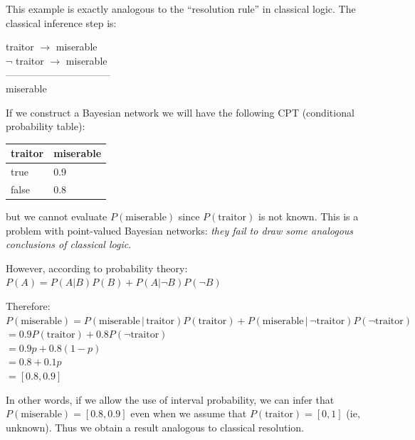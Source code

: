 This example is exactly analogous to the ``resolution rule'' in classical logic.  The classical inference step is:

\hspace*{1cm} traitor $\rightarrow$ miserable\\
\hspace*{1cm} $\neg$ traitor $\rightarrow$ miserable\\ 
\hspace*{1cm} --------------------------------\\
\hspace*{1cm} miserable

If we construct a Bayesian network we will have the following CPT (conditional probability table):\\
\hspace*{1cm} \begin{tabular}{|l|l|} \hline
\textbf{traitor} & \textbf{miserable}\\ \hline
true             & 0.9\\
false            & 0.8\\ \hline
\end{tabular}

but we cannot evaluate $P(\mbox{miserable})$ since $P(\mbox{traitor})$ is not known.  This is a problem with point-valued Bayesian networks: \emph{they fail to draw some analogous conclusions of classical logic}.

However, according to probability theory:\\
\hspace*{1cm} $ P(A) = P(A | B) P(B) + P(A | \neg B) P(\neg B) $

Therefore:\\
\hspace*{1cm} $ P(\mbox{miserable}) = P(\mbox{miserable} \,|\, \mbox{traitor}) P(\mbox{traitor}) + P(\mbox{miserable} \,|\, \neg\mbox{traitor}) P(\neg\mbox{traitor}) $\\
\hspace*{1cm} $= 0.9 P(\mbox{traitor}) + 0.8 P(\neg\mbox{traitor}) $\\
\hspace*{1cm} $= 0.9 p + 0.8 (1 - p) $\\ 
\hspace*{1cm} $= 0.8 + 0.1 p $\\
\hspace*{1cm} $= [0.8, 0.9] $

In other words, if we allow the use of interval probability, we can infer that $P(\mbox{miserable}) = [0.8, 0.9]$ even when we assume that $P(\mbox{traitor}) = [0,1]$ (ie, unknown). Thus we obtain a result analogous to classical resolution.

